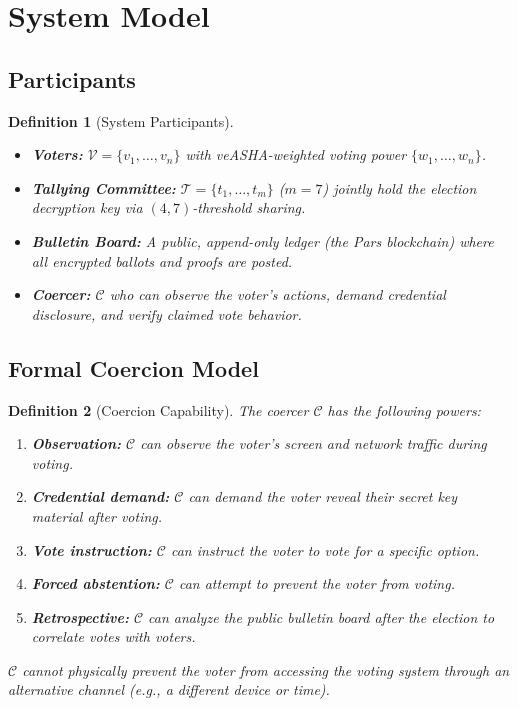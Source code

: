 \documentclass[11pt,a4paper]{article}
\newcommand{\CC}{\mathcal{C}}
\newtheorem{definition}{Definition}
\begin{document}
\section{System Model}

\subsection{Participants}

\begin{definition}[System Participants]
\begin{itemize}
    \item \textbf{Voters:} $\mathcal{V} = \{v_1, \ldots, v_n\}$ with veASHA-weighted voting power $\{w_1, \ldots, w_n\}$.
    \item \textbf{Tallying Committee:} $\mathcal{T} = \{t_1, \ldots, t_m\}$ ($m = 7$) jointly hold the election decryption key via $(4, 7)$-threshold sharing.
    \item \textbf{Bulletin Board:} A public, append-only ledger (the Pars blockchain) where all encrypted ballots and proofs are posted.
    \item \textbf{Coercer:} $\CC$ who can observe the voter's actions, demand credential disclosure, and verify claimed vote behavior.
\end{itemize}
\end{definition}

\subsection{Formal Coercion Model}

\begin{definition}[Coercion Capability]
The coercer $\CC$ has the following powers:
\begin{enumerate}[label=(\alph*)]
    \item \textbf{Observation:} $\CC$ can observe the voter's screen and network traffic during voting.
    \item \textbf{Credential demand:} $\CC$ can demand the voter reveal their secret key material after voting.
    \item \textbf{Vote instruction:} $\CC$ can instruct the voter to vote for a specific option.
    \item \textbf{Forced abstention:} $\CC$ can attempt to prevent the voter from voting.
    \item \textbf{Retrospective:} $\CC$ can analyze the public bulletin board after the election to correlate votes with voters.
\end{enumerate}
$\CC$ cannot physically prevent the voter from accessing the voting system through an alternative channel (e.g., a different device or time).
\end{definition}
\end{document}
